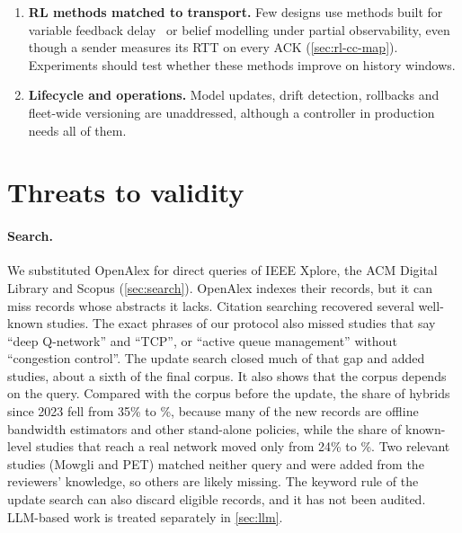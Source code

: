 \begin{enumerate}
  \item \textbf{RL methods matched to transport.} Few designs use methods built for variable feedback delay~\cite{ramstedt2021reinforcement} or belief modelling under partial observability, even though a sender measures its RTT on every ACK (\cref{sec:rl-cc-map}). Experiments should test whether these methods improve on history windows.
  \item \textbf{Lifecycle and operations.} Model updates, drift detection, rollbacks and fleet-wide versioning are unaddressed, although a controller in production needs all of them.
\end{enumerate}

\section{Threats to validity}
\label{sec:threats}

\paragraph{Search.} We substituted OpenAlex for direct queries of IEEE Xplore, the ACM Digital Library and Scopus (\cref{sec:search}). OpenAlex indexes their records, but it can miss records whose abstracts it lacks. Citation searching recovered several well-known studies. The exact phrases of our protocol also missed studies that say ``deep Q-network'' and ``TCP'', or ``active queue management'' without ``congestion control''. The update search closed much of that gap and added \nUpdateStudies{} studies, about a sixth of the final corpus. It also shows that the corpus depends on the query. Compared with the corpus before the update, the share of hybrids since 2023 fell from 35\% to \nPctHybridPost\%, because many of the new records are offline bandwidth estimators and other stand-alone policies, while the share of known-level studies that reach a real network moved only from 24\% to \nPctRealOfKnown\%. Two relevant studies (Mowgli and PET) matched neither query and were added from the reviewers' knowledge, so others are likely missing. The keyword rule of the update search can also discard eligible records, and it has not been audited. LLM-based work is treated separately in \cref{sec:llm}.

